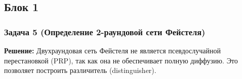 \subsection{Блок 1}\label{ux431ux43bux43eux43a-1}

\subsubsection{Задача 5 (Определение 2-раундовой сети Фейстеля)}\label{ux437ux430ux434ux430ux447ux430-5-ux43eux43fux440ux435ux434ux435ux43bux435ux43dux438ux435-2-ux440ux430ux443ux43dux434ux43eux432ux43eux439-ux441ux435ux442ux438-ux444ux435ux439ux441ux442ux435ux43bux44f}

\textbf{Решение:} Двухраундовая сеть Фейстеля не является псевдослучайной перестановкой (PRP), так как она не обеспечивает полную диффузию. Это позволяет построить различитель (distinguisher).

